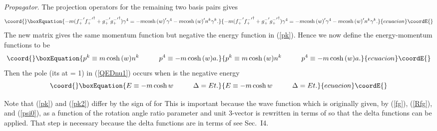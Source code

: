 \documentclass[a4paper,12pt]{article}
\begin{document}
	\coordHE{} {\textit{Propagator}}. The projection operators for the remaining two \coordHE{} basis pairs gives
\begin{equation}\coord{}\boxEquation{	\label{Epmatrix2}
- m (  {f_{+}^{-}}^{\prime} {{f_{+}^{-}}^{\prime}}^{\dagger}  + {g_{+}^{-}}^{\prime} {{g_{+}^{-}}^{\prime}}^{\dagger} ) \gamma^{4} = -m {\cosh{(w)}}^{\prime} \gamma^{4} - m {\cosh{(w)}}^{\prime}n^{k} \gamma^{k} .
}{	- m (  {f_{+}^{-}}^{\prime} {{f_{+}^{-}}^{\prime}}^{\dagger}  + {g_{+}^{-}}^{\prime} {{g_{+}^{-}}^{\prime}}^{\dagger} ) \gamma^{4} = -m {\cosh{(w)}}^{\prime} \gamma^{4} - m {\cosh{(w)}}^{\prime}n^{k} \gamma^{k} .
}{ecuacion}\coordE{}\end{equation}
The new matrix gives the same momentum function but negative the energy function in (\ref{pk}). Hence we now define the energy-momentum functions to be
\begin{equation}\coord{}\boxEquation{ \label{pk2}
p^{k} \equiv m \cosh{(w)} n^{k} \hspace{1cm} p^{4} \equiv - m\cosh{(w)} a .
}{ p^{k} \equiv m \cosh{(w)} n^{k} \hspace{1cm} p^{4} \equiv - m\cosh{(w)} a .
}{ecuacion}\coordE{}\end{equation}
Then the pole (its at \coordHE{} = 1) in (\ref{QEDnu1}) occurs when \coordHE{} is the negative energy \coordHE{}
\begin{equation}\coord{}\boxEquation{	\label{E2}
E \equiv - m \cosh{w} \hspace{1cm} \Delta = E t.
}{	E \equiv - m \cosh{w} \hspace{1cm} \Delta = E t.
}{ecuacion}\coordE{}\end{equation} 


	Note that (\ref{pk}) and (\ref{pk2}) differ by the sign of \coordHE{} for \coordHE{} This is important because the wave function \myHighlight{$\psi$}\coordHE{} which is originally given, by (\ref{fg}), (\ref{Rfg}), and (\ref{psi0}), as a function of the rotation angle \myHighlight{$\theta,$}\coordHE{} ratio parameter \coordHE{} and unit 3-vector \coordHE{} is rewritten in terms of \coordHE{} so that the delta functions can be applied. That step is necessary because the delta functions are in terms of \coordHE{} see Sec.~I4.
\end{document}
